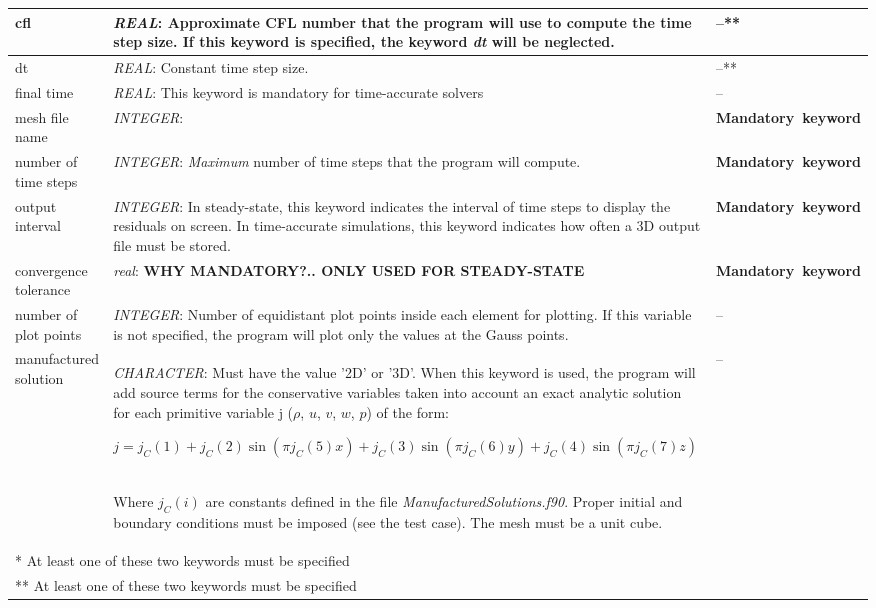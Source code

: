\documentclass[a4paper,10pt]{report}
\begin{document}
\begin{table}[htbp]
\begin{tabular}{|l|p{10cm}|p{2.2cm}|}
cfl & \textit{REAL}: Approximate CFL number that the program will use to compute the time step size. If this keyword is specified, the keyword \textit{dt} will be neglected. & --** \\ \hline

dt  & \textit{REAL}: Constant time step size.  & --** \\ \hline

final time  & \textit{REAL}: This keyword is mandatory for time-accurate solvers & -- \\ \hline

mesh file name & \textit{INTEGER}:  & \textbf{Mandatory\ keyword} \\ \hline

number of time steps & \textit{INTEGER}: \textit{Maximum} number of time steps that the program will compute.  & \textbf{Mandatory\ keyword} \\ \hline

output interval   & \textit{INTEGER}: In steady-state, this keyword indicates the interval of time steps to display the residuals on screen. In time-accurate simulations, this keyword indicates how often a 3D output file must be stored.  & \textbf{Mandatory\ keyword} \\ \hline

convergence tolerance & \textit{real}: \textbf{WHY MANDATORY?.. ONLY USED FOR STEADY-STATE}  & \textbf{Mandatory\ keyword} \\ \hline

number of plot points & \textit{INTEGER}: Number of equidistant plot points inside each element for plotting. If this variable is not specified, the program will plot only the values at the Gauss points.  & -- \\ \hline

manufactured solution & \textit{CHARACTER}: Must have the value '2D' or '3D'. When this keyword is used, the program will add source terms for the conservative variables taken into account an exact analytic solution for each primitive variable j ($\rho$, $u$, $v$, $w$, $p$) of the form:\
 
$j = j_C(1) + j_C(2) \sin(\pi j_C(5) x) + j_C(3) \sin(\pi j_C(6) y) + j_C(4) \sin(\pi j_C(7) z) $\

Where $j_C(i)$ are constants defined in the file \textit{ManufacturedSolutions.f90}. Proper initial and boundary conditions must be imposed (see the test case). The mesh must be a unit cube.
  & -- \\ \hline

\multicolumn{3}{l}{*  At least one of these two keywords must be specified} \\

\multicolumn{3}{l}{** At least one of these two keywords must be specified}

\end{tabular}
\label{tab:runningkey}
\end{table}
\end{document}
